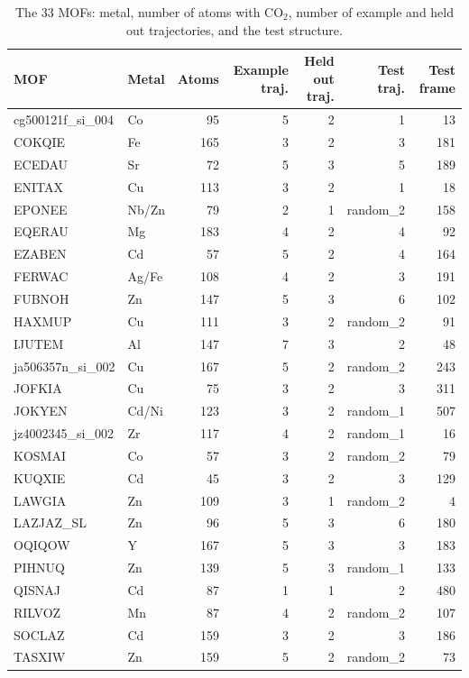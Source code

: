 \begin{table}[h]
\caption{The 33 MOFs: metal, number of atoms with CO$_2$, number of example and held out trajectories, and the test structure.}
\label{tab:si-mof}
\centering
\footnotesize
\renewcommand{\baselinestretch}{1}\selectfont
\setlength{\tabcolsep}{4pt}
\renewcommand{\arraystretch}{0.9}
\begin{tabular}{llrrrrr}
\toprule
MOF & Metal & Atoms & Example traj. & Held out traj. & Test traj. & Test frame \\
\midrule
cg500121f\_si\_004 & Co & 95 & 5 & 2 & 1 & 13 \\
COKQIE & Fe & 165 & 3 & 2 & 3 & 181 \\
ECEDAU & Sr & 72 & 5 & 3 & 5 & 189 \\
ENITAX & Cu & 113 & 3 & 2 & 1 & 18 \\
EPONEE & Nb/Zn & 79 & 2 & 1 & random\_2 & 158 \\
EQERAU & Mg & 183 & 4 & 2 & 4 & 92 \\
EZABEN & Cd & 57 & 5 & 2 & 4 & 164 \\
FERWAC & Ag/Fe & 108 & 4 & 2 & 3 & 191 \\
FUBNOH & Zn & 147 & 5 & 3 & 6 & 102 \\
HAXMUP & Cu & 111 & 3 & 2 & random\_2 & 91 \\
IJUTEM & Al & 147 & 7 & 3 & 2 & 48 \\
ja506357n\_si\_002 & Cu & 167 & 5 & 2 & random\_2 & 243 \\
JOFKIA & Cu & 75 & 3 & 2 & 3 & 311 \\
JOKYEN & Cd/Ni & 123 & 3 & 2 & random\_1 & 507 \\
jz4002345\_si\_002 & Zr & 117 & 4 & 2 & random\_1 & 16 \\
KOSMAI & Co & 57 & 3 & 2 & random\_2 & 79 \\
KUQXIE & Cd & 45 & 3 & 2 & 3 & 129 \\
LAWGIA & Zn & 109 & 3 & 1 & random\_2 & 4 \\
LAZJAZ\_SL & Zn & 96 & 5 & 3 & 6 & 180 \\
OQIQOW & Y & 167 & 5 & 3 & 3 & 183 \\
PIHNUQ & Zn & 139 & 5 & 3 & random\_1 & 133 \\
QISNAJ & Cd & 87 & 1 & 1 & 2 & 480 \\
RILVOZ & Mn & 87 & 4 & 2 & random\_2 & 107 \\
SOCLAZ & Cd & 159 & 3 & 2 & 3 & 186 \\
TASXIW & Zn & 159 & 5 & 2 & random\_2 & 73 \\

\end{tabular}
\end{table}
